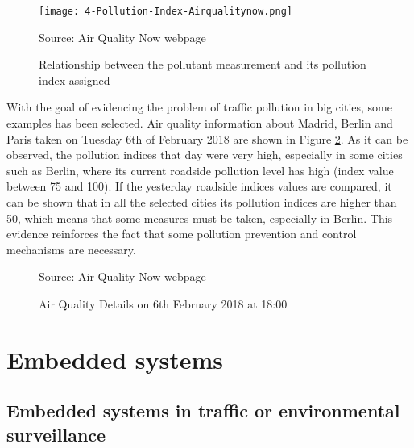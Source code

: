 \begin{figure}[!h]
	\begin{center}
		\texttt{[image: 4-Pollution-Index-Airqualitynow.png]}	
		\caption{Relationship between the pollutant measurement and its pollution index assigned}{Source: Air Quality Now webpage \cite{airqualitynow}}
		\label{fig:4-Pollution-Index-Airqualitynow}
	\end{center}
\end{figure}

With the goal of evidencing the problem of traffic pollution in big cities, some examples has been selected. Air quality information about Madrid, Berlin and Paris taken on Tuesday 6th of February 2018 are shown in Figure \ref{fig:4-AirQuality-Details}.
As it can be observed, the pollution indices that day were very high, especially in some cities such as Berlin, where its current roadside pollution level has high (index value between 75 and 100). If the yesterday roadside indices values are compared, it can be shown that in all the selected cities its pollution indices are higher than 50, which means that some measures must be taken, especially in Berlin. This evidence reinforces the fact that some pollution prevention and control mechanisms are necessary.

\begin{figure}[htb]
	\centering
	\caption{Air Quality Details on 6th February 2018 at 18:00}
	\label{fig:4-AirQuality-Details}{Source: Air Quality Now webpage \cite{airqualitynow}}
\end{figure}



\section{Embedded systems}

\subsection{Embedded systems in traffic or environmental surveillance}

